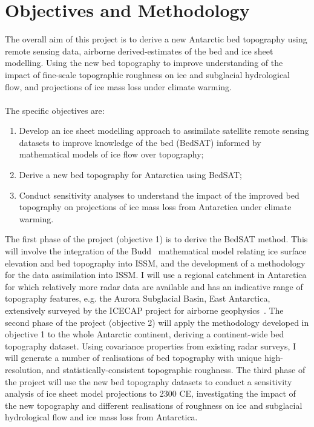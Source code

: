 \chapter{Objectives and Methodology}

The overall aim of this project is to derive a new Antarctic bed topography using remote sensing data, airborne derived-estimates of the bed and ice sheet modelling. Using the new bed topography to improve understanding of the impact of fine-scale topographic roughness on ice and subglacial hydrological flow, and projections of ice mass loss under climate warming.\\
\\The specific objectives are:
\begin{enumerate}
    \item Develop an ice sheet modelling approach to assimilate satellite remote sensing datasets to improve knowledge of the bed (BedSAT) informed by mathematical models of ice flow over topography;
    \item Derive a new bed topography for Antarctica using BedSAT;
    \item Conduct sensitivity analyses to understand the impact of the improved bed topography on projections of ice mass loss from Antarctica under climate warming.
\end{enumerate}

The first phase of the project (objective 1) is to derive the BedSAT method. This will involve the integration of the Budd~\cite{Budd_1970} mathematical model relating ice surface elevation and bed topography into ISSM, and the development of a methodology for the data assimilation into ISSM. I will use a regional catchment in Antarctica for which relatively more radar data are available and has an indicative range of topography features, e.g. the Aurora Subglacial Basin, East Antarctica, extensively surveyed by the ICECAP project for airborne geophysics~\cite{Young_2011}. The second phase of the project (objective 2) will apply the methodology developed in objective 1 to the whole Antarctic continent, deriving a continent-wide bed topography dataset. Using covariance properties from existing radar surveys, I will generate a number of realisations of bed topography with unique high-resolution, and statistically-consistent topographic roughness. The third phase of the project will use the new bed topography datasets to conduct a sensitivity analysis of ice sheet model projections to 2300 CE, investigating the impact of the new topography and different realisations of roughness on ice and subglacial hydrological flow and ice mass loss from Antarctica.\\

